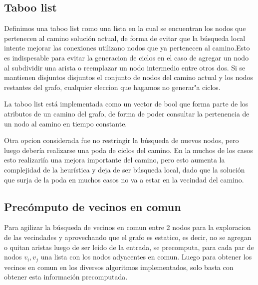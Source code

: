 \subsection{Taboo list}
  Definimos una taboo list como una lista en la cual se encuentran los nodos que pertenecen al camino soluci\'on actual, de forma de evitar que la b\'usqueda local intente mejorar las conexiones utilizano nodos que ya pertenecen al camino.Esto es indispesable para evitar la generacion de ciclos en el caso de agregar un nodo al subdividir una arista o reemplazar un nodo
intermedio entre otros dos. Si se mantienen disjuntos disjuntos el conjunto de nodos del camino actual y los nodos restantes del grafo, cualquier eleccion que hagamos no generar\''a ciclos.

\vspace{2mm}

La taboo list est\'a implementada como un vector de bool que forma parte de los atributos de un camino del grafo, de forma de poder consultar la pertenencia de un nodo al camino en tiempo constante.

\vspace{2mm}

	Otra opcion considerada fue no restringir la b\'usqueda de nuevos nodos, pero luego deber\'ia realizarse una poda de ciclos del camino. En la muchos de los casos esto realizari\'ia una mejora importante del camino, pero esto aumenta la complejidad de la heur\'istica y deja de ser b\'usqueda local, dado que la soluci\'on que surja de la poda en muchos casos no va a estar en la vecindad del camino.
 
\subsection{Prec\'omputo de vecinos en comun}
Para agilizar la b\'usqueda de vecinos en comun entre 2 nodos para la exploracion de las vecindades y aprovechando que el grafo es estatico, es decir, no se agregan o quitan aristas luego de ser leido de la entrada, se precomputa, para cada par de nodos $v_i,v_j$ una lista con los nodos adyacentes en comun. Luego para obtener los vecinos en comun en los diversos algoritmos implementados, solo basta con obtener esta informaci\'on precomputada.

